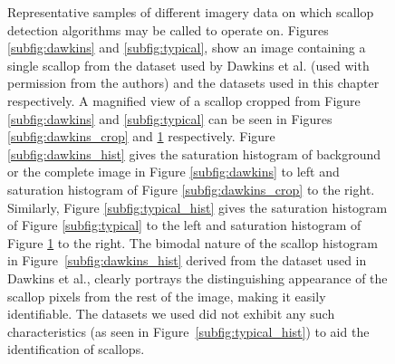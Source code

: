 \documentclass {udthesis}
\begin{document}
\begin{figure}
\begin{minipage}[c]{\textwidth}
\begin{subfigure}[]{0.235\textwidth}
	\caption{}
	\label{subfig:typical_crop}
	\hskip 15pt
    \end{subfigure}
  \end{minipage}
  \caption[Comparison of scallop recognition results with existing methods]{Representative samples of different imagery data on which
  scallop detection algorithms may be called to operate on.  Figures \ref{subfig:dawkins}
  and \ref{subfig:typical},
  show an image containing a single scallop from the dataset used by Dawkins et al.\cite{dawkings13} (used with permission from the authors) 
  and the datasets used in this chapter respectively.
  A magnified
  view of a scallop cropped from Figure \ref{subfig:dawkins} 
  and \ref{subfig:typical} can be seen in Figures \ref{subfig:dawkins_crop} 
  and \ref{subfig:typical_crop} respectively.
  Figure \ref{subfig:dawkins_hist} 
  gives the saturation histogram of background or the complete 
  image in Figure \ref{subfig:dawkins} to left and 
  saturation histogram of Figure \ref{subfig:dawkins_crop} to the right.
  Similarly, Figure \ref{subfig:typical_hist} 
  gives the saturation histogram of Figure \ref{subfig:typical} to the left and 
  saturation histogram of Figure \ref{subfig:typical_crop} to the right. The bimodal 
  nature of the scallop histogram
  in Figure~\ref{subfig:dawkins_hist} 
  derived from the dataset used in Dawkins et al.\cite{dawkings13}, clearly portrays the distinguishing appearance of the scallop pixels from the rest of the image, making it easily identifiable. The datasets we
  used did not exhibit any such characteristics (as seen in Figure~\ref{subfig:typical_hist}) 
  to aid the identification of scallops.}
  \label{data-difference} 
\end{figure}
\end{document}
